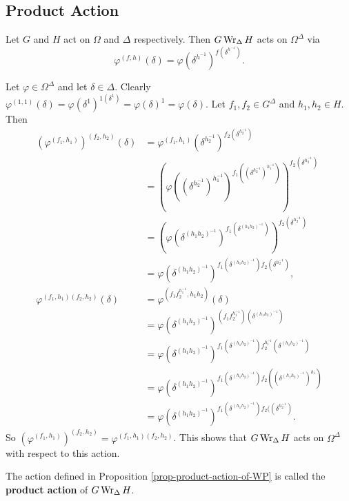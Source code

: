\subsection{Product Action}
\begin{proposition} \label{prop-product-action-of-WP}
	Let $G$ and $H$ act on $\Omega$ and $\Delta$ respectively. Then $G\operatorname{Wr}_\Delta H$  acts on $\Omega^\Delta$ via
	\begin{equation*}
	\varphi^{(f,h)}(\delta) = \varphi(\delta^{h^{-1}})^{f(\delta^{h^{-1}})}.
	\end{equation*} 
\end{proposition}
\begin{sketch}
	Let $\varphi\in \Omega^\Delta$ and let $\delta\in \Delta$. 
	Clearly $\varphi^{(1,1)}(\delta) = \varphi(\delta^{1})^{1(\delta^{1})} = \varphi(\delta)^{1} = \varphi(\delta)$. Let $f_1,f_2\in G^\Delta$ and $h_1,h_2\in H$. Then  
	\begin{align*}
		(\varphi^{(f_1,h_1)})^{(f_2,h_2)}(\delta) &= \varphi^{(f_1,h_1)}(\delta^{h_2^{-1}})^{f_2(\delta^{h_2^{-1}})}
		\\
		&= (\varphi((\delta^{h_2^{-1}})^{h_1^{-1}})^{f_1((\delta^{h_2^{-1}})^{h_1^{-1}})})^{f_2(\delta^{h_2^{-1}})}
		\\
		&= (\varphi(\delta^{(h_1h_2)^{-1}})^{f_1(\delta^{(h_1h_2)^{-1}})})^{f_2(\delta^{h_2^{-1}})}
		\\
		&= \varphi(\delta^{(h_1h_2)^{-1}})^{f_1(\delta^{(h_1h_2)^{-1}})f_2(\delta^{h_2^{-1}})},
		\\
\varphi^{(f_1,h_1)(f_2,h_2)}(\delta)&= \varphi^{(f_1f_2^{h_1^{-1}},h_1h_2)}(\delta)
\\
&= \varphi(\delta^{(h_1h_2)^{-1}})^{(f_1f_2^{h_1^{-1}})(\delta^{(h_1h_2)^{-1}})}
\\
&= \varphi(\delta^{(h_1h_2)^{-1}})^{f_1(\delta^{(h_1h_2)^{-1}})f_2^{h_1^{-1}}(\delta^{(h_1h_2)^{-1}})}
\\
&= \varphi(\delta^{(h_1h_2)^{-1}})^{f_1(\delta^{(h_1h_2)^{-1}})f_2((\delta^{(h_1h_2)^{-1}})^{h_1})}
\\
&= \varphi(\delta^{(h_1h_2)^{-1}})^{f_1(\delta^{(h_1h_2)^{-1}})f_2((\delta^{h_2^{-1}})}.
\end{align*}
	So $(\varphi^{(f_1,h_1)})^{(f_2,h_2)}  =\varphi^{(f_1,h_1)(f_2,h_2)}$. This shows that $G\operatorname{Wr}_{\Delta} H$ acts on $\Omega^\Delta$ with respect to this action.
\end{sketch}
\begin{definition}
	The action defined in Proposition \ref{prop-product-action-of-WP} is called the \textbf{product action} of $G\operatorname{Wr}_{\Delta} H$.
\end{definition}
